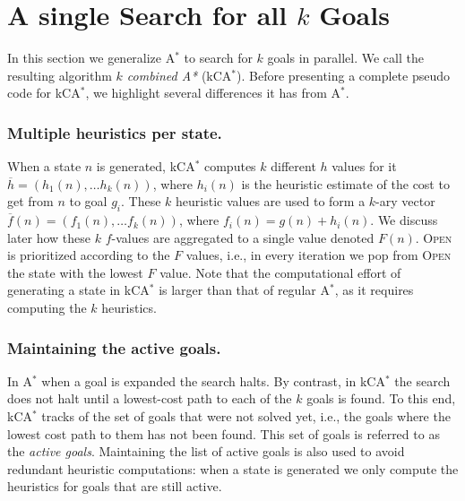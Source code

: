 \documentclass{aicom2e}
\newcommand{\astar}{A$^*$}
\newcommand{\kastar}{kCA$^*$}
\newcommand{\open}{\textsc{Open}}
\begin{document}
\section{A single Search for all $k$ Goals}
\label{sec:one-k-goal-search} In this section we generalize \astar{} to search
for $k$ goals in parallel. We call the resulting algorithm {\em $k$ combined
A*} (\kastar{}). Before presenting a complete pseudo code for \kastar{}, we
highlight several differences it has from \astar{}.

\subsubsection*{Multiple heuristics per state.}

When a state $n$ is generated, \kastar{} computes $k$ different $h$ values for
it $\overline{h}=(h_1(n),\ldots h_k(n))$, where $h_i(n)$ is the heuristic
estimate of the cost to get from $n$ to goal $g_i$. These $k$ heuristic values
are used to form a $k$-ary vector $\overline{f}(n)=(f_1(n),\ldots f_k(n))$,
where $f_i(n)=g(n)+h_i(n)$. We discuss later how these $k$ $f$-values are
aggregated to a single value denoted $F(n)$. \open{} is prioritized according
to the $F$ values, i.e., in every iteration we pop from \open{} the state with
the lowest $F$ value. Note that the computational effort of generating a state
in \kastar{} is larger than that of regular \astar{}, as it requires computing
the $k$ heuristics.


\subsubsection*{Maintaining the active goals.}

In \astar{} when a goal is expanded the search halts. By contrast, in \kastar{}
the search does not halt until a lowest-cost path to each of the $k$ goals is
found. To this end, \kastar{} tracks of the set of goals that were not solved
yet, i.e., the goals where the lowest cost path to them has not been found.
This set of goals is referred to as the {\em active goals}. Maintaining the
list of active goals is also used to avoid redundant heuristic computations:
when a state is generated we only compute the heuristics for goals that are
still active.
\end{document}

